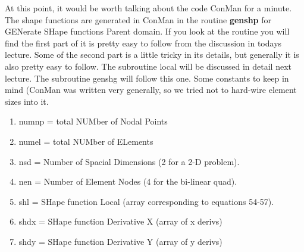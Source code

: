 \documentclass{article}
\begin{document}
At this point, it would be worth talking about the code ConMan for a minute.
The shape functions are generated in ConMan in the routine {\bf genshp} for
GENerate SHape functions Parent domain.  If you look at the routine you will
find the first part of it is pretty easy to follow from the discussion in
todays lecture.   Some of the second part is a little tricky in its details,
but generally it is also pretty easy to follow.   The subroutine local will 
be discussed in detail next lecture.  The subroutine genshg will follow this
one.    Some constants to keep in mind (ConMan was written very generally,
so we tried not to hard-wire element sizes into it.
\begin{enumerate}
\item numnp = total NUMber of Nodal Points

\item numel = total NUMber of ELements

\item nsd = Number of Spacial Dimensions (2 for a 2-D problem).

\item nen = Number of Element Nodes (4 for the bi-linear quad).

\item shl = SHape function Local (array corresponding to equations 54-57).

\item shdx = SHape function Derivative X (array of x derivs)

\item shdy = SHape function Derivative Y (array of y derivs)
\end{enumerate}
\end{document}
